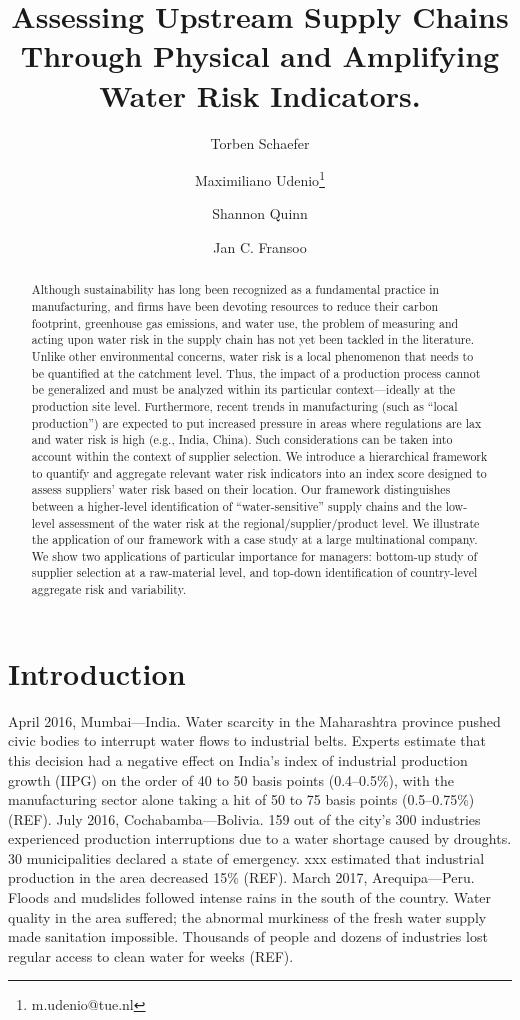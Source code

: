 \documentclass[a4paper]{article}
\title{Assessing Upstream Supply Chains Through Physical and Amplifying Water Risk Indicators.}
\author{Torben Schaefer}
\author{Maximiliano Udenio\thanks{m.udenio@tue.nl} }
\author{Shannon Quinn}
\author{Jan C. Fransoo}
\affil{Department of Industrial Engineering, Eindhoven University of Technology, 5600 MB Eindhoven, The Netherlands}
\date{}
\begin{document}
\sloppy %

\maketitle

\begin{abstract}
Although sustainability has long been recognized as a fundamental practice in manufacturing, and firms have been devoting resources to reduce their carbon footprint, greenhouse gas emissions, and water use, the problem of measuring and acting upon water risk in the supply chain has not yet been tackled in the literature. 
Unlike other environmental concerns, water risk is a local phenomenon that needs to be quantified at the catchment level.  
Thus, the impact of a production process cannot be generalized and must be analyzed within its particular context---ideally at the production site level.
Furthermore, recent trends in manufacturing (such as ``local production'') are expected to put increased pressure in areas where regulations are lax and water risk is high (e.g., India, China).
Such considerations can be taken into account within the context of supplier selection.
We introduce a hierarchical framework to quantify and aggregate relevant water risk indicators into an index score designed to assess suppliers' water risk based on their location. 
Our framework distinguishes between a higher-level identification of ``water-sensitive'' supply chains and the low-level assessment of the water risk at the regional/supplier/product level. 
We illustrate the application of our framework with a case study at a large multinational company. 
We show two applications of particular importance for managers: bottom-up study of supplier selection at a raw-material level, and top-down identification of country-level aggregate risk and variability.
\end{abstract}

\section{Introduction}

April 2016, Mumbai---India. 
Water scarcity in the Maharashtra province pushed civic bodies to interrupt water flows to industrial belts. 
Experts estimate that this decision had a negative effect on India's index of industrial production growth (IIPG) on the order of 40 to 50 basis points (0.4--0.5\%), with the manufacturing sector alone taking a hit of 50 to 75 basis points (0.5--0.75\%) (REF).
July 2016, Cochabamba---Bolivia. 
159 out of the city's 300 industries experienced production interruptions due to a water shortage caused by droughts. 
30 municipalities declared a state of emergency. 
xxx estimated that industrial production in the area decreased 15\% (REF). 
March 2017, Arequipa---Peru. 
Floods and mudslides followed intense rains in the south of the country. 
Water quality in the area suffered; the abnormal murkiness of the fresh water supply made sanitation impossible. 
Thousands of people and dozens of industries lost regular access to clean water for weeks (REF).
\end{document}
